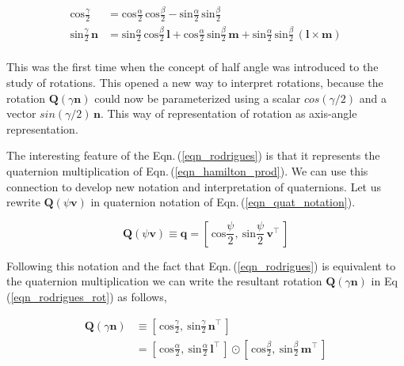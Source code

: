 \documentclass[12pt]{article}
\begin{document}
\begin{equation}
    \begin{split}
        \text{cos}\frac{\gamma}{2} &= \text{cos}\frac{\alpha}{2} \, \text{cos}\frac{\beta}{2} - \text{sin}\frac{\alpha}{2} \, \text{sin}\frac{\beta}{2} \\
        \text{sin}\frac{\gamma}{2} \, \bm{n} &= \text{sin}\frac{\alpha}{2} \, \text{cos}\frac{\beta}{2} \, \bm{l} + \text{cos}\frac{\alpha}{2} \, \text{sin}\frac{\beta}{2} \, \bm{m} + \text{sin}\frac{\alpha}{2} \, \text{sin}\frac{\beta}{2} \, (\bm{l} \times \bm{m}) \\
    \end{split}
\label{eqn_rodrigues}
\end{equation}

This was the first time when the concept of half angle was introduced to the study of rotations. This opened a new way to interpret rotations, because the rotation $\bm{Q}(\gamma \bm{n})$ could now be parameterized using a scalar $cos(\gamma/2)$ and a vector $sin(\gamma/2) \, \bm{n}$. This way of representation of rotation as axis-angle representation.

The interesting feature of the Eqn.\,(\ref{eqn_rodrigues}) is that it represents the quaternion multiplication of Eqn.\,(\ref{eqn_hamilton_prod}). We can use this connection to develop new notation and interpretation of quaternions. Let us rewrite $\bm{Q}(\psi \bm{v})$ in quaternion notation of Eqn.\,(\ref{eqn_quat_notation}).

\begin{equation}
    \bm{Q}(\psi \bm{v}) \equiv \bm{q} =
    \left[\,\text{cos} \frac{\psi}{2} ,\: \text{sin} \frac{\psi}{2} \, \bm{v}^{\intercal}\, \right]
\end{equation}

Following this notation and the fact that Eqn.\,(\ref{eqn_rodrigues}) is equivalent to the quaternion multiplication we can write the resultant rotation $\bm{Q}(\gamma \bm{n})$ in Eq\,(\ref{eqn_rodrigues_rot}) as follows,

\begin{equation}
    \begin{split}
        \bm{Q}(\gamma \bm{n}) &\equiv
        \left[\,\text{cos} \frac{\gamma}{2} ,\:\text{sin} \frac{\gamma}{2} \, \bm{n}^{\intercal}\, \right] \\   
        &=
        \left[\,\text{cos} \frac{\alpha}{2} ,\: \text{sin} \frac{\alpha}{2} \, \bm{l}^{\intercal}\, \right]
        \odot
        \left[\,\text{cos} \frac{\beta}{2} ,\: \text{sin} \frac{\beta}{2} \, \bm{m}^{\intercal}\, \right]
    \end{split} 
\end{equation}
\end{document}
